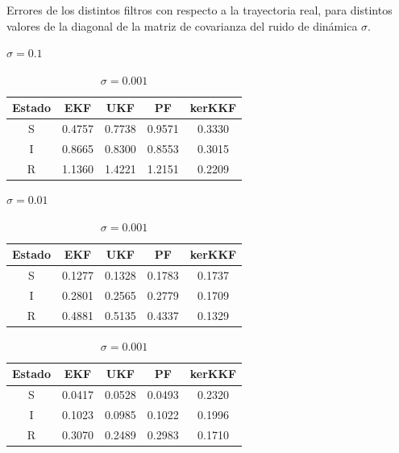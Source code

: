 \begin{table}[h!]
    \caption{Errores de los distintos filtros con respecto a la trayectoria real, para distintos valores de la diagonal de la matriz de covarianza del ruido de dinámica $\sigma$.}
    \begin{subtable}{\linewidth}
        \centering
    \caption{$\sigma = 0.1$}
    \begin{tabular}{|c|c|c|c|c|}
    \hline
    \textbf{Estado} & \textbf{EKF} & \textbf{UKF} & \textbf{PF} & \textbf{kerKKF} \\ \hline
    S & 0.4757 & 0.7738 & 0.9571 & 0.3330 \\ \hline
    I & 0.8665 & 0.8300 & 0.8553 & 0.3015 \\ \hline
    R & 1.1360 & 1.4221 & 1.2151 & 0.2209 \\ \hline
    \end{tabular}
    \label{tab:errores_sigma_01}
    \end{subtable}
    \begin{subtable}{\linewidth}
        \centering
    \caption{$\sigma = 0.01$}
    \begin{tabular}{|c|c|c|c|c|}
    \hline
    \textbf{Estado} & \textbf{EKF} & \textbf{UKF} & \textbf{PF} & \textbf{kerKKF} \\ \hline
    S & 0.1277 & 0.1328 & 0.1783 & 0.1737 \\ \hline
    I & 0.2801 & 0.2565 & 0.2779 & 0.1709 \\ \hline
    R & 0.4881 & 0.5135 & 0.4337 & 0.1329 \\ \hline
    \end{tabular}
    \label{tab:errores_sigma_001}
    \end{subtable}
    \begin{subtable}{\linewidth}
        \centering
    \caption{$\sigma = 0.001$}
    \begin{tabular}{|c|c|c|c|c|}
    \hline
    \textbf{Estado} & \textbf{EKF} & \textbf{UKF} & \textbf{PF} & \textbf{kerKKF} \\ \hline
    S & 0.0417 & 0.0528 & 0.0493 & 0.2320 \\ \hline
    I & 0.1023 & 0.0985 & 0.1022 & 0.1996 \\ \hline
    R & 0.3070 & 0.2489 & 0.2983 & 0.1710 \\ \hline
    \end{tabular}
    \label{tabla:errores_sigma_0001}
    \end{subtable}
\end{table}

